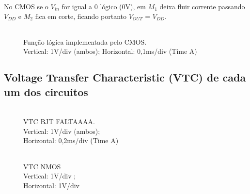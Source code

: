 \documentclass[pdftex,12pt,a4paper]{report}
\begin{document}
No CMOS se o $V_{in}$ for igual a 0 lógico (0V), em $M_1$ deixa fluir corrente passando $V_{DD}$ e $M_2$ fica em corte, ficando portanto $V_{OUT}$ = $V_{DD}$.

\begin{figure}[h]
  \centerline{}
  \caption{\\Função lógica implementada pelo CMOS. \\Vertical: 1V/div (ambos); Horizontal: 0,1ms/div (Time A)}\label{cmos}
\end{figure}

\newpage
\subsection{Voltage Transfer Characteristic (VTC) de cada um dos circuitos}
\begin{figure}[!htb]
  \centerline{}
  \caption{\\VTC BJT FALTAAAA. \\Vertical: 1V/div (ambos); \\Horizontal: 0,2ms/div (Time A)}\label{bjt}
\endminipage\hfill
{}
  \centerline{}
  \caption{\\VTC NMOS \\Vertical: 1V/div ; \\Horizontal: 1V/div }\label{fig:nmos}
\endminipage\hfill
\end{figure}
\end{document}
